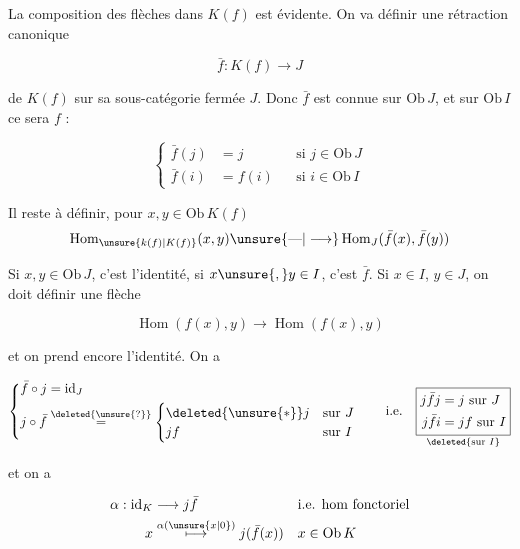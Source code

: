 La composition des flèches dans $K(f)$ est évidente. On va définir une rétraction canonique

\[
\bar f:K(f)\longrightarrow J
\]

de $K(f)$ sur sa sous-catégorie fermée $J$. Donc $\bar f$ est connue sur $\mathrm{Ob}\,J$, et sur $\mathrm{Ob}\,I$ ce sera $f$ :

\[
\left\{\begin{aligned}
\bar f(j)&=j&&\text{si }j\in\mathrm{Ob}\,J\\
\bar f(i)&=f(i)&&\text{si }i\in\mathrm{Ob}\,I
\end{aligned}\right.
\]

 Il reste à définir, pour $x,y\in\mathrm{Ob}\,K(f)$
\[
\operatorname{Hom}_{\unsure{k(f)|K(f)}}(x,y)\unsure{\text{---}|\longrightarrow}
\operatorname{Hom}_J(\bar f(x),\bar f(y))
\]

Si $x,y\in\mathrm{Ob}\,J$, c'est l'identité, si $x\unsure{,}y\in I$, c'est $\bar f$. Si $x\in I$, $y\in J$, on doit définir une flèche

\[
\operatorname{Hom}(f(x),y)\longrightarrow\operatorname{Hom}(f(x),y)
\]

et on prend encore l'identité.  On a


\[
\left\{\begin{aligned}
\bar f\circ j&=\mathrm{id}_J\\
j\circ\bar f&\overset{\deleted{\unsure{?}}}{=}
\begin{cases}\deleted{\unsure{*}}j&\text{sur }J\\jf&\text{sur }I\end{cases}
\end{aligned}\right.
\qquad\text{i.e.}\quad
\underset{\deleted{\text{sur }I}}{\boxed{\begin{aligned}
j\bar f j&=j\ \text{sur }J\\
j\bar f i&=jf\ \text{sur }I
\end{aligned}}}
\]

et on a 

\[
\begin{aligned}
\alpha:\mathrm{id}_K&\longrightarrow j\bar f&&\text{i.e. hom fonctoriel}\\
x&\overset{\alpha(\unsure{x|0})}{\longmapsto}j(\bar f(x))&&x\in\mathrm{Ob}\,K
\end{aligned}
\]

